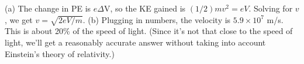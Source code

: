  (a) The change in PE is $e\Delta $V, so the KE gained is
$(1/2)mv^2=eV$. Solving for $v$, we get $v=\sqrt{2eV/m}$. (b) Plugging in numbers, the
velocity is  $5.9\times10^7$  m/s. This is about 20\% of the speed
of light. (Since it's not that close to the speed of light,
we'll get a reasonably accurate answer without taking into
account Einstein's theory of relativity.)
